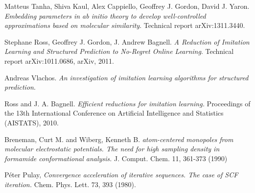 \documentclass[twoside]{article}
\begin{document}
\begin{thebibliography}{9}
  Matteus Tanha, Shiva Kaul, Alex Cappiello, Geoffrey J. Gordon, David J. Yaron.
  \emph{Embedding parameters in ab initio theory to develop well-controlled approximations based on molecular similarity}.
  Technical report arXiv:1311.3440.
  
  Stephane Ross, Geoffrey J. Gordon, J. Andrew Bagnell.
  \emph{A Reduction of Imitation Learning and Structured Prediction to No-Regret Online Learning}.
  Technical report arXiv:1011.0686, arXiv, 2011.
  
  Andreas Vlachos.
  \emph{An investigation of imitation learning algorithms for structured prediction}.
  
    Ross and J. A. Bagnell.
  \emph{Efficient reductions for imitation
learning.} Proceedings of the 13th International
Conference on Artificial Intelligence and Statistics (AISTATS),
2010.

	Breneman, Curt M. and Wiberg, Kenneth B.
  \emph{ atom-centered monopoles from molecular electrostatic potentials. The need for high sampling density in formamide conformational analysis.} J. Comput. Chem. 11, 361-373 (1990)

   P\'{e}ter Pulay,
  \emph{Convergence acceleration of iterative sequences. The case of SCF iteration.} Chem. Phys. Lett. 73, 393 (1980).

\end{thebibliography}
\end{document}
